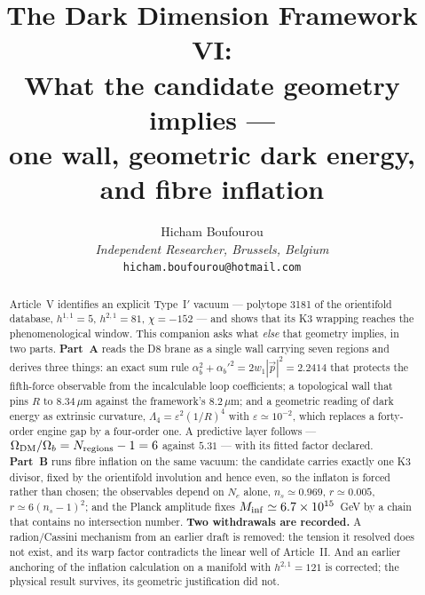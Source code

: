 
\graphicspath{{figures/}{../figures/}}
\title{\textbf{The Dark Dimension Framework VI:\\ What the candidate geometry implies ---\\ one wall, geometric dark energy, and fibre inflation}}
\author{Hicham Boufourou\\ \small\textit{Independent Researcher, Brussels, Belgium}\\ \small\texttt{hicham.boufourou@hotmail.com}}
\maketitle
\begin{abstract}
\noindent Article~V identifies an explicit Type~I$'$ vacuum --- polytope 3181 of the orientifold database, $h^{1,1}=5$, $h^{2,1}=81$, $\chi=-152$ --- and shows that its K3 wrapping reaches the phenomenological window. This companion asks what \emph{else} that geometry implies, in two parts. \textbf{Part~A} reads the D8 brane as a single wall carrying seven regions and derives three things: an exact sum rule $\alpha_b^2+\alpha_b'^2=2w_1|\vec p|^2=2.2414$ that protects the fifth-force observable from the incalculable loop coefficients; a topological wall that pins $R$ to $8.34\,\mu$m against the framework's $8.2\,\mu$m; and a geometric reading of dark energy as extrinsic curvature, $\Lambda_4=\varepsilon^2(1/R)^4$ with $\varepsilon\simeq10^{-2}$, which replaces a forty-order engine gap by a four-order one. A predictive layer follows --- $\Omega_{\rm DM}/\Omega_b=N_{\rm regions}-1=6$ against $5.31$ --- with its fitted factor declared. \textbf{Part~B} runs fibre inflation on the same vacuum: the candidate carries exactly one K3 divisor, fixed by the orientifold involution and hence even, so the inflaton is forced rather than chosen; the observables depend on $N_e$ alone, $n_s\simeq0.969$, $r\simeq0.005$, $r\simeq6(n_s-1)^2$; and the Planck amplitude fixes $M_{\rm inf}\simeq6.7\times10^{15}$~GeV by a chain that contains no intersection number. \textbf{Two withdrawals are recorded.} A radion/Cassini mechanism from an earlier draft is removed: the tension it resolved does not exist, and its warp factor contradicts the linear well of Article~II. And an earlier anchoring of the inflation calculation on a manifold with $h^{2,1}=121$ is corrected; the physical result survives, its geometric justification did not.
\end{abstract}

